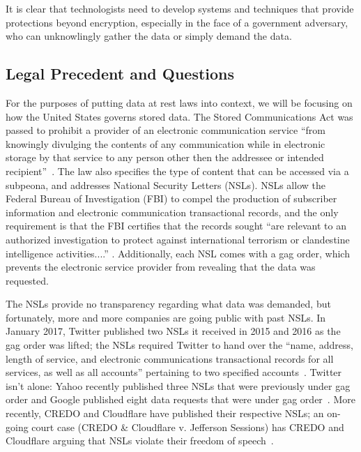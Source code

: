 It is clear that technologists need to develop systems and techniques that provide protections beyond encryption, especially in the face of a government adversary, who can unknowlingly gather the data or simply demand the data.

\subsection{Legal Precedent and Questions}
For the purposes of putting data at rest laws into context, we will be focusing on how the United States governs stored data.  The Stored Communications Act was passed to prohibit a provider of an electronic communication service ``from knowingly divulging the contents of any communication while in electronic storage by that service to any person other then the addressee or intended recipient''~\cite{stored_comm}.  The law also specifies the type of content that can be accessed via a subpeona, and addresses National Security Letters (NSLs).  NSLs allow the Federal Bureau of Investigation (FBI) to compel the production of subscriber information and electronic communication transactional records, and the only requirement is that the FBI certifies that the records sought ``are relevant to an authorized investigation to protect against international terrorism or clandestine intelligence activities....'' \cite{stored_comm}.  Additionally, each NSL comes with a gag order, which prevents the electronic service provider from revealing that the data was requested.  

The NSLs provide no transparency regarding what data was demanded, but fortunately, more and more companies are going public with past NSLs.  In January 2017, Twitter published two NSLs it received in 2015 and 2016 as the gag order was lifted; the NSLs required Twitter to hand over the ``name, address, length of service, and electronic communications transactional records for all services, as well as all accounts'' pertaining to two specified accounts~\cite{twitter_gag}.  Twitter isn't alone: Yahoo recently published three NSLs that were previously under gag order and Google published eight data requests that were under gag order~\cite{yahoo_gag,google_gag}. More recently, CREDO and Cloudflare have published their respective NSLs; an on-going court case (CREDO \& Cloudflare v. Jefferson Sessions) has CREDO and Cloudflare arguing that NSLs violate their freedom of speech~\cite{cloudflare_gag}.  

